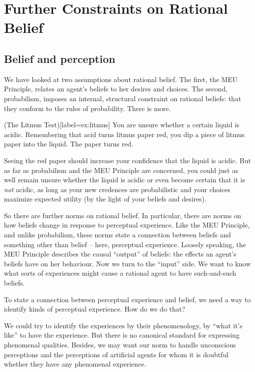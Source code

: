 \chapter{Further Constraints on Rational Belief}\label{ch:constraints}

\section{Belief and perception}

We have looked at two assumptions about rational belief. The first, the MEU
Principle, relates an agent's beliefs to her desires and choices. The second,
probabilism, imposes an internal, structural constraint on rational beliefs:
that they conform to the rules of probability. There is more.

\begin{example}(The Litmus Test)[label=ex:litmus]
  You are unsure whether a certain liquid is acidic. Remembering that
  acid turns litmus paper red, you dip a piece of litmus paper into
  the liquid. The paper turns red.
\end{example}
%
\noindent%
Seeing the red paper should increase your confidence that the liquid is
acidic. But as far as probabilism and the MEU Principle are concerned, you could
just as well remain unsure whether the liquid is acidic or even become certain
that it is \emph{not} acidic, as long as your new credences are probabilistic
and your choices maximize expected utility (by the light of your beliefs and
desires).

So there are further norms on rational belief. In particular, there are norms on
how beliefs change in response to perceptual experience. Like the MEU Principle,
and unlike probabilism, these norms state a connection between beliefs and
something other than belief -- here, perceptual experience. Loosely speaking,
the MEU Principle describes the causal ``output'' of beliefs: the effects an
agent's beliefs have on her behaviour. Now we turn to the ``input'' side. We
want to know what sorts of experiences might cause a rational agent to have
such-and-such beliefs.

To state a connection between perceptual experience and belief, we need a way to
identify  kinds of perceptual experience. How do we do that?

We could try to identify the experiences by their phenomenology, by
``what it's like'' to have the experience. But there is no canonical standard
for expressing phenomenal qualities. Besides, we may want our norm to handle
unconscious perceptions and the perceptions of artificial agents for whom it is
doubtful whether they have any phenomenal experience.

